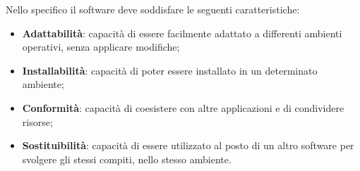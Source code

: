 \begin{itemize}
Nello specifico il software deve soddisfare le seguenti caratteristiche:
		\begin{itemize}
			\item \textbf{Adattabilità}: capacità di essere facilmente adattato a differenti ambienti operativi, senza applicare modifiche;
			\item \textbf{Installabilità}: capacità di poter essere installato in un determinato ambiente;
			\item \textbf{Conformità}: capacità di coesistere con altre applicazioni e di condividere risorse;
			\item \textbf{Sostituibilità}: capacità di essere utilizzato al posto di un altro software per svolgere gli stessi compiti, nello stesso ambiente.
		\end{itemize}
	\end{itemize}
